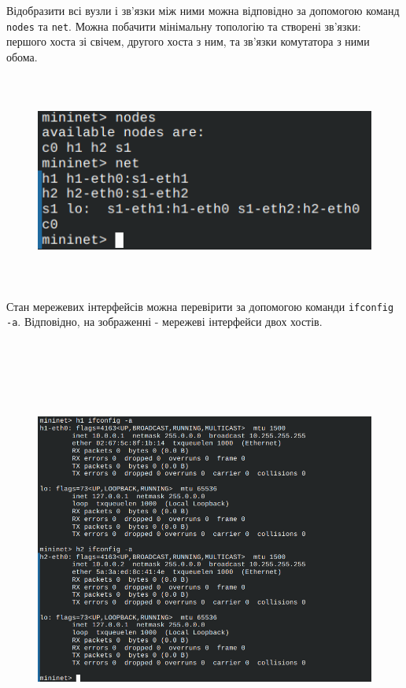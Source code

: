 \documentclass[14pt, a4paper]{extreport}
\begin{document}
	Відобразити всі вузли і зв'язки між ними можна відповідно за допомогою команд \texttt{nodes} та \texttt{net}. Можна побачити мінімальну топологію та створені зв'язки: першого хоста зі свічем, другого хоста з ним, та зв'язки комутатора з ними обома.
	
	\begin{figure}[H]
		\centering
		\includegraphics[height=7cm]{08} 
	\end{figure}
	
	Стан мережевих інтерфейсів можна перевірити за допомогою команди \texttt{ifconfig -a}. Відповідно, на зображенні - мережеві інтерфейси двох хостів.
	
	\begin{figure}[H]
		\centering
		\includegraphics[height=14cm]{09} 
	\end{figure}
	
\end{document}
